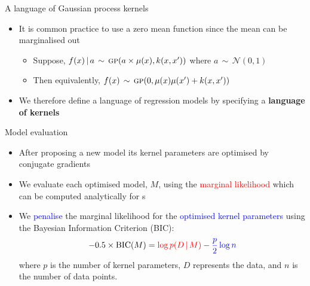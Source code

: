 \begin{frame}{A language of Gaussian process kernels}
  \begin{itemize}
    \item It is common practice to use a zero mean function since the mean can be marginalised out
  \begin{itemize}
    \item Suppose, ${f(x) \,|\, a \,\sim\, {\textsc{gp}}{}(a \times \mu(x), k(x,x'))}$ where $a \,\sim\, \mathcal{N}(0,1)$
    \item Then equivalently, $f(x) \,\sim\, {\textsc{gp}}{}(0, \mu(x)\mu(x') + k(x,x'))$
  \end{itemize}
  \vspace{\baselineskip}
  \item We therefore define a language of \gp{} regression models by
specifying a {\bf language of kernels}
  \end{itemize}
\end{frame}

\begin{frame}{Model evaluation}
  \begin{itemize}
    \item After proposing a new model its kernel parameters are optimised by conjugate gradients
    \vspace{\baselineskip}
    \item We evaluate each optimised model, $M$, using the \textcolor{red}{marginal likelihood} which can be computed analytically for \gp{}s
    \vspace{\baselineskip}
    \item We \textcolor{blue}{penalise} the marginal likelihood for the \textcolor{blue}{optimised kernel parameters} using the Bayesian Information Criterion (BIC):
\[
-0.5 \times \textrm{BIC}(M) = \textcolor{red}{\log p(D\,|\, M)} - \textcolor{blue}{\frac{p}{2} \log n}
\]
where $p$ is the number of kernel parameters, $D$ represents the data, and $n$ is the number of data points.
  \end{itemize}
\end{frame}

